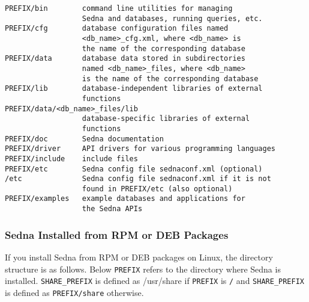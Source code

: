 \documentclass[a4paper,12pt]{article}
\begin{document}
\begin{verbatim}
PREFIX/bin        command line utilities for managing 
                  Sedna and databases, running queries, etc.
PREFIX/cfg        database configuration files named 
                  <db_name>_cfg.xml, where <db_name> is 
                  the name of the corresponding database
PREFIX/data       database data stored in subdirectories 
                  named <db_name>_files, where <db_name> 
                  is the name of the corresponding database 									
PREFIX/lib        database-independent libraries of external 
                  functions
PREFIX/data/<db_name>_files/lib        
                  database-specific libraries of external
                  functions                  
PREFIX/doc        Sedna documentation
PREFIX/driver     API drivers for various programming languages
PREFIX/include    include files
PREFIX/etc        Sedna config file sednaconf.xml (optional)
/etc              Sedna config file sednaconf.xml if it is not 
                  found in PREFIX/etc (also optional)
PREFIX/examples   example databases and applications for 
                  the Sedna APIs
\end{verbatim}

\subsubsection{Sedna Installed from RPM or DEB Packages}
\label{sec:rpm-deb-pack}
If you install Sedna from RPM or DEB packages on Linux, the directory structure is as follows.
Below \verb!PREFIX! refers to the directory where Sedna is installed. 
\verb!SHARE_PREFIX! is defined as /usr/share if \verb!PREFIX! is \verb!/! and \verb!SHARE_PREFIX! is defined as \verb!PREFIX/share! otherwise.
\end{document}
